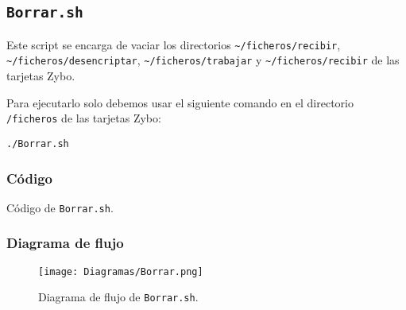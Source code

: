 \documentclass[12pt,letterpaper]{article}
\begin{document}
\subsection{\texttt{Borrar.sh}}
Este script se encarga de vaciar los directorios \texttt{\textasciitilde/ficheros/recibir},\\ \texttt{\textasciitilde/ficheros/desencriptar}, \texttt{\textasciitilde/ficheros/trabajar} y \texttt{\textasciitilde/ficheros/recibir} de las tarjetas Zybo.

Para ejecutarlo solo debemos usar el siguiente comando en el directorio \texttt{/ficheros} de las tarjetas Zybo:
\begin{center}
	\texttt{./Borrar.sh}
\end{center}

\subsubsection{Código}

\begin{center}
	Código de \texttt{Borrar.sh}.
\end{center}

\subsubsection{Diagrama de flujo}
\begin{figure}[h]
	\centering
	\texttt{[image: Diagramas/Borrar.png]}
	\caption{Diagrama de flujo de \texttt{Borrar.sh}.}
	\label{Diagrama de flujo de Borrar.sh}
\end{figure}




\end{document}
